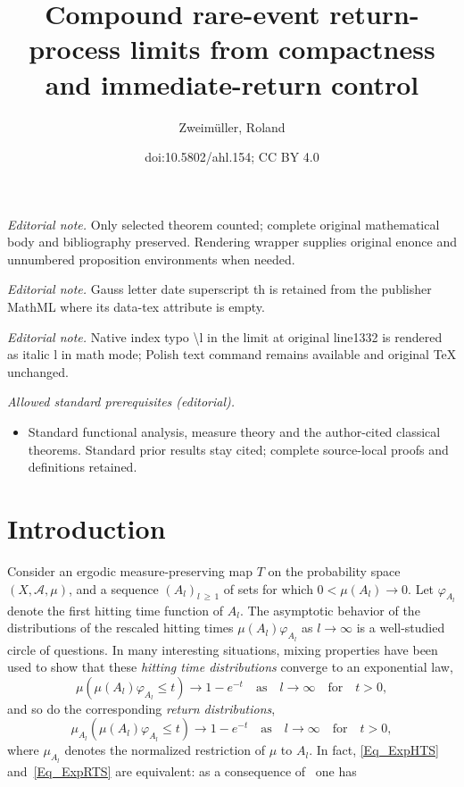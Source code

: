 \documentclass[10pt]{amsart}
\title{Compound rare-event return-process limits from compactness and immediate-return control}
\author{Zweimüller, Roland}
\date{doi:10.5802/ahl.154; CC BY 4.0}
\theoremstyle{definition}\newtheorem{defi}[theo]{Definition}\newtheorem{rema}[theo]{Remark}\newtheorem{exam}[theo]{Example}\newtheorem{exem}[theo]{Example}\newtheorem{nota}[theo]{Notation}
\newcommand{\clA}{\mathcal{A}}
\begin{document}
\maketitle
\noindent\textit{Editorial note.} Only selected theorem counted; complete original mathematical body and bibliography preserved. Rendering wrapper supplies original enonce and unnumbered proposition environments when needed.\par\medskip
\noindent\textit{Editorial note.} Gauss letter date superscript th is retained from the publisher MathML where its data-tex attribute is empty.\par\medskip
\noindent\textit{Editorial note.} Native index typo \textbackslash{}l in the limit at original line1332 is rendered as italic l in math mode; Polish text command remains available and original TeX unchanged.\par\medskip
\noindent\textit{Allowed standard prerequisites (editorial).}\begin{itemize}
\item Standard functional analysis, measure theory and the author-cited classical theorems. Standard prior results stay cited; complete source-local proofs and definitions retained.
\end{itemize}\medskip

\section{Introduction}

Consider an ergodic measure-preserving map $T$ on the probability space $(X,\clA,\mu)$, and a sequence $(A_{l})_{l\,\geq\,1}$ of sets for which $0<\mu(A_{l})\rightarrow0$. Let $\varphi_{A_{l}}$ denote the first hitting time function of $A_{l}$. The asymptotic behavior of the distributions of the rescaled hitting times $\mu(A_{l})\varphi_{A_{l}}$ as $l\rightarrow\infty$ is a well-studied circle of questions. In many interesting situations, mixing properties have been used to show that these \emph{hitting time distributions} converge to an exponential law,
\begin{equation}\label{Eq_ExpHTS}
\mu\left(\mu(A_{l})\varphi_{A_{l}}\leq t\right)\longrightarrow1-e^{-t} \quad\text{as}\quad l\rightarrow\infty\quad\text{for} \quad t>0, 
\end{equation}
and so do the corresponding \emph{return distributions},
\begin{equation}\label{Eq_ExpRTS}
\mu_{A_{l}}\left(\mu(A_{l})\varphi_{A_{l}}\leq t\right)\longrightarrow1-e^{-t}\quad \text{as}\quad l\rightarrow\infty\quad \text{for}\quad t>0, 
\end{equation}
where $\mu_{A_{l}}$ denotes the normalized restriction of $\mu$ to $A_{l}$. In fact, \eqref{Eq_ExpHTS} and~\eqref{Eq_ExpRTS} are equivalent: as a consequence of~\cite[Theorem~2.1]{HSV} one has
\end{document}
